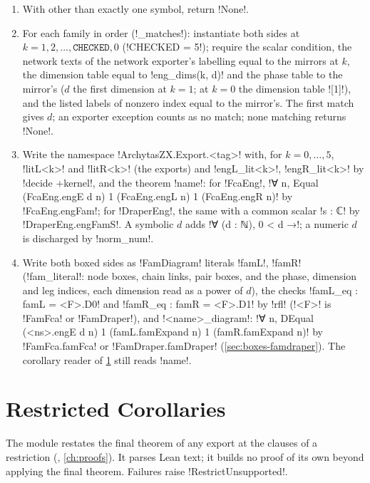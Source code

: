 {{{\begin{algorithm}\label{alg:lean-export-adder}
\begin{enumerate}
\item With other than exactly one symbol, return \py!None!.
\item For each family in order (\py!_matches!): instantiate both sides at $k=1,2,\ldots,\texttt{CHECKED},0$ (\py!CHECKED = 5!); require the scalar condition, the network texts of the network exporter's labelling equal to the mirrors at $k$, the dimension table equal to \py!eng_dims(k, d)! and the phase table to the mirror's ($d$ the first dimension at $k=1$; at $k=0$ the dimension table \code![1]!), and the listed labels of nonzero index equal to the mirror's. The first match gives $d$; an exporter exception counts as no match; none matching returns \py!None!.
\item Write the namespace \lean!ArchytasZX.Export.<tag>! with, for $k=0,\ldots,5$, \lean!litL<k>! and \lean!litR<k>! (the exports) and \lean!engL_lit<k>!, \lean!engR_lit<k>! by \lean!decide +kernel!, and the theorem \lean!name!: for \code!FcaEng!, \lean!∀ n, Equal (FcaEng.engE d n) 1 (FcaEng.engL n) 1 (FcaEng.engR n)! by \lean!FcaEng.engFam!; for \code!DraperEng!, the same with a common scalar \lean!s : ℂ! by \lean!DraperEng.engFamS!. A symbolic $d$ adds \lean!∀ (d : ℕ), 0 < d →!; a numeric $d$ is discharged by \lean!norm_num!.
\item Write both boxed sides as \lean!FamDiagram! literals \lean!famL!, \lean!famR! (\py!fam_literal!: node boxes, chain links, pair boxes, and the phase, dimension and leg indices, each dimension read as a power of $d$), the checks \lean!famL_eq : famL = <F>.D0! and \lean!famR_eq : famR = <F>.D1! by \lean!rfl! (\lean!<F>! is \lean!FamFca! or \lean!FamDraper!), and \lean!<name>_diagram!: \lean!∀ n, DEqual (<ns>.engE d n) 1 (famL.famExpand n) 1 (famR.famExpand n)! by \lean!FamFca.famFca! or \lean!FamDraper.famDraper! (\cref{sec:boxes-famdraper}). The corollary reader of \cref{sec:lean-export-restrict} still reads \lean!name!.
\end{enumerate}
\end{algorithm}

\section{Restricted Corollaries}\label{sec:lean-export-restrict}

The module  restates the final theorem of any
export at the clauses of a restriction (,
\cref{ch:proofs}). It parses Lean text; it builds no proof of its own beyond applying the final
theorem. Failures raise \lexpy!RestrictUnsupported!.

}}}
